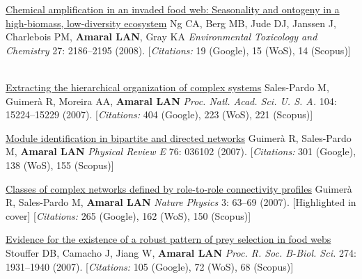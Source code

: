 \NumberedItem{\makebox[0.8cm][r]{[75]}}
\href{/people/amaral/chemical-amplification-in-an-invaded-food-web-seasonality-and-ontogeny-in-a-high-biomass-low-diversity-ecosystem}
{Chemical amplification in an invaded food web: Seasonality and ontogeny in a high-biomass, low-diversity ecosystem}
\newline
Ng CA, Berg MB, Jude DJ, Janssen J, Charlebois PM, {\textbf{Amaral LAN}}, Gray KA
\newline
\textit{Environmental Toxicology and Chemistry}
    27:
2186--2195 (2008).
    [{\em{Citations:}} 19 (Google), 15 (WoS), 14 (Scopus)]
\newline
\Gap
~
\Gap

\NumberedItem{\makebox[0.8cm][r]{[74]}}
\href{/people/amaral/extracting-the-hierarchical-organization-of-complex-systems}
{Extracting the hierarchical organization of complex systems}
\newline
Sales-Pardo M, Guimer\`a R, Moreira AA, {\textbf{Amaral LAN}}
\newline
\textit{Proc. Natl. Acad. Sci. U. S. A.}
    104:
15224--15229 (2007).
    [{\em{Citations:}} 404 (Google), 223 (WoS), 221 (Scopus)]
\newline
\Gap
~
\Gap

\NumberedItem{\makebox[0.8cm][r]{[73]}}
\href{/people/amaral/module-identification-in-bipartite-and-directed-networks}
{Module identification in bipartite and directed networks}
\newline
Guimer\`a R, Sales-Pardo M, {\textbf{Amaral LAN}}
\newline
\textit{Physical Review E}
    76:
036102 (2007).
    [{\em{Citations:}} 301 (Google), 138 (WoS), 155 (Scopus)]
\newline
\Gap
~
\Gap

\NumberedItem{\makebox[0.8cm][r]{[72]}}
\href{/people/amaral/classes-of-complex-networks-defined-by-role-to-role-connectivity-profiles}
{Classes of complex networks defined by role-to-role connectivity profiles}
\newline
Guimer\`a R, Sales-Pardo M, {\textbf{Amaral LAN}}
\newline
\textit{Nature Physics}
    3:
63--69 (2007).
    [Highlighted in cover]
    [{\em{Citations:}} 265 (Google), 162 (WoS), 150 (Scopus)]
\newline
\Gap
~
\Gap

\NumberedItem{\makebox[0.8cm][r]{[71]}}
\href{/people/amaral/evidence-for-the-existence-of-a-robust-pattern-of-prey-selection-in-food-webs}
{Evidence for the existence of a robust pattern of prey selection in food webs}
\newline
Stouffer DB, Camacho J, Jiang W, {\textbf{Amaral LAN}}
\newline
\textit{Proc. R. Soc. B-Biol. Sci.}
    274:
1931--1940 (2007).
    [{\em{Citations:}} 105 (Google), 72 (WoS), 68 (Scopus)]
\newline
\Gap
~
\Gap

